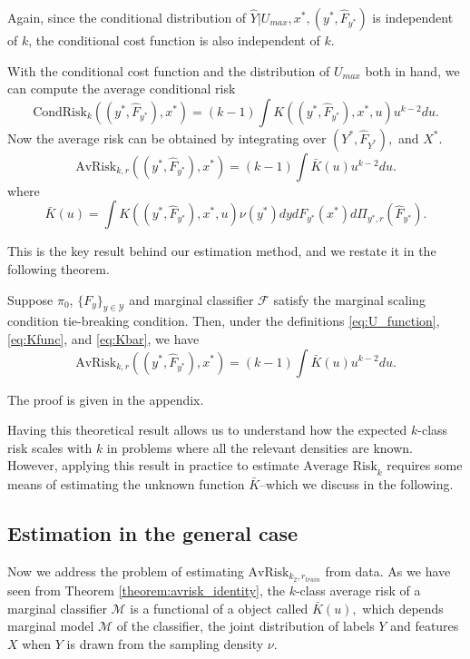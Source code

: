 \documentclass[12pt]{article}
\begin{document}
Again, since the conditional distribution of $\hat{Y}|U_{max}, x^*,
(y^*, \hat{F}_{y^*})$ is independent of $k$, the conditional cost
function is also independent of $k$.

With the conditional cost function and the distribution of $U_{max}$ both in hand, we can compute the average conditional risk
\[
\text{CondRisk}_k((y^*, \hat{F}_{y^*}), x^*) = (k-1) \int K((y^*,\hat{F}_{y^*}), x^*, u) u^{k-2} du.
\]
Now the average risk can be obtained by integrating over $(Y^*, \hat{F}_{Y^*}),$ and $X^*$.
\[
\text{AvRisk}_{k, r}((y^*, \hat{F}_{y^*}), x^*) = (k-1) \int \bar{K}(u) u^{k-2} du.
\]
where
\begin{equation}\label{eq:Kbar}
\bar{K}(u) = \int K((y^*,\hat{F}_{y^*}), x^*, u) \nu(y^*)dy dF_{y^*}(x^*) d\Pi_{y^*, r}(\hat{F}_{y^*}).
\end{equation}


This is the key result behind our estimation method, and we restate it
in the following theorem.

\begin{theorem}\label{theorem:avrisk_identity}
Suppose $\pi_0$, $\{F_y\}_{y \in \mathcal{Y}}$ and marginal classifier
$\mathcal{F}$ satisfy the marginal scaling condition tie-breaking
condition.  Then, under the
definitions \eqref{eq:U_function}, \eqref{eq:Kfunc},
and \eqref{eq:Kbar}, we have
\begin{equation}\label{eq:avrisk_identity}
\text{AvRisk}_{k, r}((y^*, \hat{F}_{y^*}), x^*) = (k-1) \int \bar{K}(u) u^{k-2} du.
\end{equation}
\end{theorem}

The proof is given in the appendix.

Having this theoretical result allows us to understand how the
expected $k$-class risk scales with $k$ in problems where all the
relevant densities are known.  However, applying this result in
practice to estimate $\text{Average Risk}_k$ requires some means of
estimating the unknown function $\bar{K}$--which we discuss in the
following.

\subsection{Estimation in the general case}\label{sec:estimation}

Now we address the problem of estimating $\text{AvRisk}_{k_2,
r_{train}}$ from data.  As we have seen from
Theorem \ref{theorem:avrisk_identity}, the $k$-class average risk of
a marginal classifier $\mathcal{M}$ is a functional of a object called
$\bar{K}(u),$ which depends marginal model $\mathcal{M}$ of the
classifier, the joint distribution of labels $Y$ and features $X$ when
$Y$ is drawn from the sampling density $\nu$.
\end{document}
